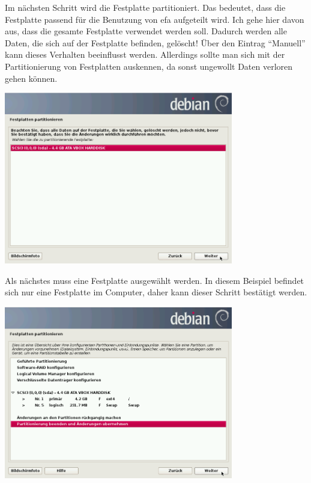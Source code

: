 \documentclass[a4paper,12pt,twoside]{article}
\begin{document}
Im nächsten Schritt wird die Festplatte partitioniert. Das bedeutet,
dass die Festplatte passend für die Benutzung von efa aufgeteilt wird.
Ich gehe hier davon aus, dass die gesamte Festplatte verwendet werden
soll. Dadurch werden alle Daten, die sich auf der Festplatte befinden,
gelöscht! Über den Eintrag "`Manuell"' kann
dieses Verhalten beeinflusst werden. Allerdings sollte man sich mit der
Partitionierung von Festplatten auskennen, da sonst ungewollt Daten
verloren gehen können.

\begin{minipage}{\linewidth}
    \centering
    \includegraphics[width=10cm]{efaLivede-img/efaLivede-img10.png}
    \label{fig:auswahl_festplatte}
\end{minipage}

Als nächstes muss eine Festplatte ausgewählt werden. In diesem Beispiel
befindet sich nur eine Festplatte im Computer, daher kann dieser
Schritt bestätigt werden.

\begin{minipage}{\linewidth}
    \centering
    \includegraphics[width=10cm]{efaLivede-img/efaLivede-img11.png}
    \label{fig:best_partitionierung}
\end{minipage}
\end{document}
